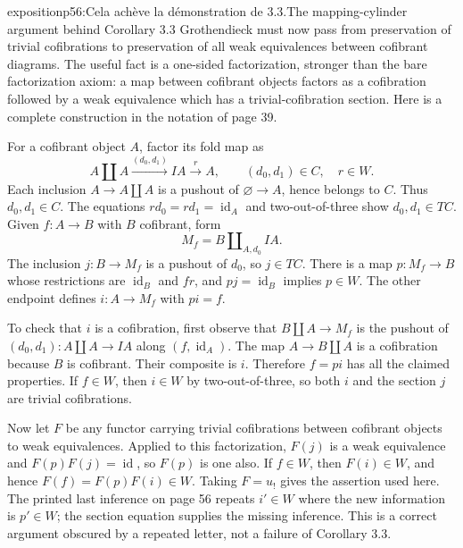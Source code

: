 \begin{dcomment}{exposition}{p56:Cela achève la démonstration de 3.3.}{The mapping-cylinder argument behind Corollary 3.3}
Grothendieck must now pass from preservation of trivial cofibrations to preservation of all weak equivalences between cofibrant diagrams. The useful fact is a one-sided factorization, stronger than the bare factorization axiom: a map between cofibrant objects factors as a cofibration followed by a weak equivalence which has a trivial-cofibration section. Here is a complete construction in the notation of page 39.

For a cofibrant object $A$, factor its fold map as
\[
 A\amalg A\xrightarrow{(d_0,d_1)}IA\xrightarrow{r}A,
 \qquad (d_0,d_1)\in C,\quad r\in W.
\]
Each inclusion $A\to A\amalg A$ is a pushout of $\varnothing\to A$, hence belongs to $C$. Thus $d_0,d_1\in C$. The equations $rd_0=rd_1=\operatorname{id}_A$ and two-out-of-three show $d_0,d_1\in TC$. Given $f:A\to B$ with $B$ cofibrant, form
\[
 M_f=B\amalg_{A,d_0}IA.
\]
The inclusion $j:B\to M_f$ is a pushout of $d_0$, so $j\in TC$. There is a map $p:M_f\to B$ whose restrictions are $\operatorname{id}_B$ and $fr$, and $pj=\operatorname{id}_B$ implies $p\in W$. The other endpoint defines $i:A\to M_f$ with $pi=f$.

To check that $i$ is a cofibration, first observe that $B\amalg A\to M_f$ is the pushout of $(d_0,d_1):A\amalg A\to IA$ along $(f,\operatorname{id}_A)$. The map $A\to B\amalg A$ is a cofibration because $B$ is cofibrant. Their composite is $i$. Therefore $f=pi$ has all the claimed properties. If $f\in W$, then $i\in W$ by two-out-of-three, so both $i$ and the section $j$ are trivial cofibrations.

Now let $F$ be any functor carrying trivial cofibrations between cofibrant objects to weak equivalences. Applied to this factorization, $F(j)$ is a weak equivalence and $F(p)F(j)=\operatorname{id}$, so $F(p)$ is one also. If $f\in W$, then $F(i)\in W$, and hence $F(f)=F(p)F(i)\in W$. Taking $F=u_!$ gives the assertion used here. The printed last inference on page 56 repeats $i'\in W$ where the new information is $p'\in W$; the section equation supplies the missing inference. This is a correct argument obscured by a repeated letter, not a failure of Corollary 3.3.
\end{dcomment}

